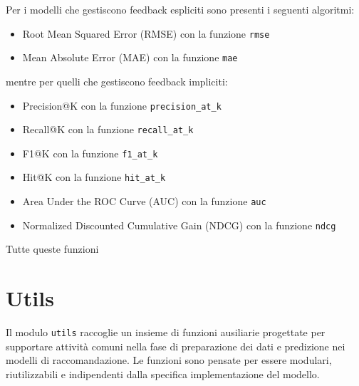 Per i modelli che gestiscono feedback espliciti sono presenti i seguenti algoritmi:

\begin{itemize}
    \item Root Mean Squared Error (RMSE) con la funzione \texttt{rmse}
    \item Mean Absolute Error (MAE) con la funzione \texttt{mae}
\end{itemize}

mentre per quelli che gestiscono feedback impliciti:

\begin{itemize}
    \item Precision@K con la funzione \texttt{precision\_at\_k}
    \item Recall@K con la funzione \texttt{recall\_at\_k}
    \item F1@K con la funzione \texttt{f1\_at\_k}
    \item Hit@K con la funzione \texttt{hit\_at\_k}
    \item Area Under the ROC Curve (AUC) con la funzione \texttt{auc}
    \item Normalized Discounted Cumulative Gain (NDCG) con la funzione \texttt{ndcg}
\end{itemize}

Tutte queste funzioni

\section{Utils}

Il modulo \texttt{utils} raccoglie un insieme di funzioni ausiliarie progettate per supportare attività comuni nella fase di preparazione dei dati e predizione nei modelli di raccomandazione. Le funzioni sono pensate per essere modulari, riutilizzabili e indipendenti dalla specifica implementazione del modello.


